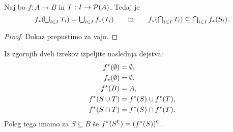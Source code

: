 \begin{izrek}
  Naj bo $f : A \to B$ in $T : I \to \mathcal{P}(A)$. Tedaj je
  \begin{equation*}
    \textstyle
     f_{*} (\bigcup_{i \in I} T_i) = \bigcup_{i \in I} f_{*}(T_i)
     \qquad\text{in}\qquad
     f_{*} (\bigcap_{i \in I} T_i) \subseteq \bigcap_{i \in I} f_{*}(S_i).
  \end{equation*}
\end{izrek}

\begin{proof}
  Dokaz prepustimo za vajo.
\end{proof}

\begin{vaja}
  Iz zgornjih dveh izrekov izpeljite naslednja dejstva:
  \begin{align*}
    f^{*}(\emptyset) &= \emptyset, \\
    f_{*}(\emptyset) &= \emptyset, \\
    f^{*}(B) &= A, \\
    f^{*}(S \cup T) &= f^{*}(S) \cup f^{*}(T), \\
    f^{*}(S \cap T) &= f^{*}(S) \cap f^{*}(T).
  \end{align*}
  Poleg tega imamo za $S \subseteq B$ še $f^{*}(S^{\mathsf{C}}) = (f^{*}(S))^{\mathsf{C}}$.
\end{vaja}

